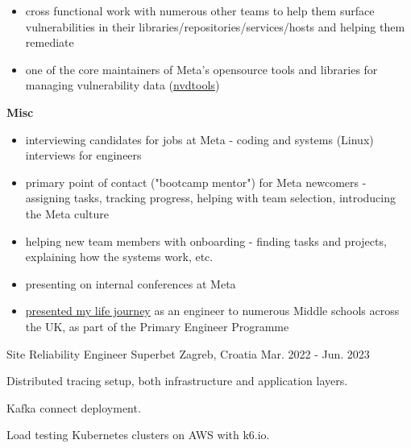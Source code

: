 \begin{cventries}
{\begin{cvitems}
{\begin{itemize}
          \item {cross functional work with numerous other teams to help them surface vulnerabilities in their libraries/repositories/services/hosts and helping them remediate}
          \item {one of the core maintainers of Meta's opensource tools and libraries for managing vulnerability data (\href{https://github.com/facebookincubator/nvdtools}{nvdtools})}
        \end{itemize}
      }
      \item {
        \textbf{Misc}
        \begin{itemize}
          \item {interviewing candidates for jobs at Meta - coding and systems (Linux) interviews for engineers}
          \item {primary point of contact ("bootcamp mentor") for Meta newcomers - assigning tasks, tracking progress, helping with team selection, introducing the Meta culture}
          \item {helping new team members with onboarding - finding tasks and projects, explaining how the systems work, etc.}
          \item {presenting on internal conferences at Meta}
          \item {\href{https://www.youtube.com/watch?v=wP3OpdfOYok}{presented my life journey} as an engineer to numerous Middle schools across the UK, as part of the Primary Engineer Programme}
        \end{itemize}
      }
    \end{cvitems}
  }

  \cventry
    {Site Reliability Engineer} %
    {Superbet} %
    {Zagreb, Croatia} %
    {Mar. 2022 - Jun. 2023} %
    {
      \begin{cvitems} %
        \item {Distributed tracing setup, both infrastructure and application layers.}
        \item {Kafka connect deployment.}
        \item {Load testing Kubernetes clusters on AWS with k6.io.}
      \end{cvitems}
    }


\end{cventries}
